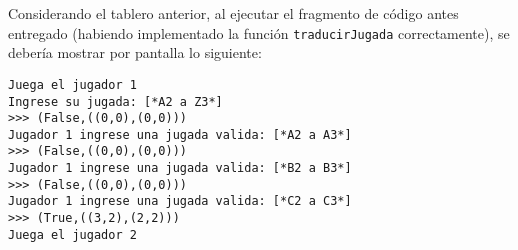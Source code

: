 Considerando el tablero anterior, al ejecutar el fragmento de código antes entregado (habiendo implementado la función \texttt{traducirJugada} correctamente), se debería mostrar por pantalla lo siguiente:

\begin{lstlisting}[style=consola]
Juega el jugador 1
Ingrese su jugada: [*A2 a Z3*]
>>> (False,((0,0),(0,0)))  
Jugador 1 ingrese una jugada valida: [*A2 a A3*]
>>> (False,((0,0),(0,0)))
Jugador 1 ingrese una jugada valida: [*B2 a B3*]
>>> (False,((0,0),(0,0)))
Jugador 1 ingrese una jugada valida: [*C2 a C3*]
>>> (True,((3,2),(2,2)))
Juega el jugador 2
\end{lstlisting}



